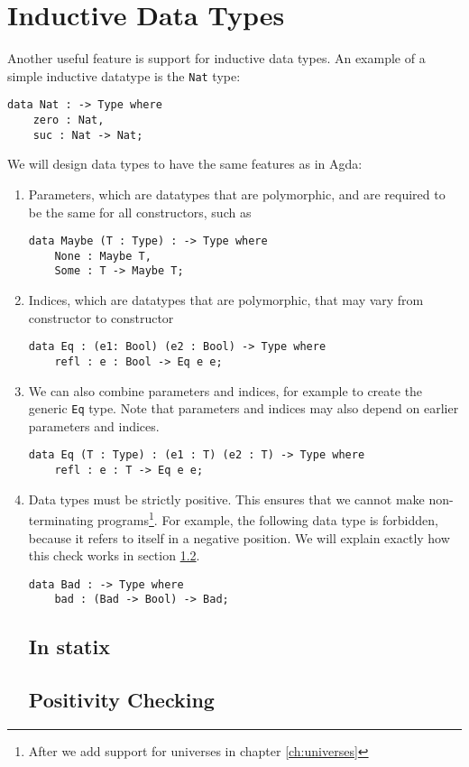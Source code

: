 \chapter{Inductive Data Types}
\label{ch:datatypes}

Another useful feature is support for inductive data types. An example of a simple inductive datatype is the \verb|Nat| type:
\begin{lstlisting}
data Nat : -> Type where
    zero : Nat,
    suc : Nat -> Nat;
\end{lstlisting}
We will design data types to have the same features as in Agda:
\begin{enumerate}
\item Parameters, which are datatypes that are polymorphic, and are required to be the same for all constructors, such as
\begin{lstlisting}
data Maybe (T : Type) : -> Type where
    None : Maybe T,
    Some : T -> Maybe T;
\end{lstlisting}
\item Indices, which are datatypes that are polymorphic, that may vary from constructor to constructor
\begin{lstlisting}
data Eq : (e1: Bool) (e2 : Bool) -> Type where
    refl : e : Bool -> Eq e e;
\end{lstlisting}
\item We can also combine parameters and indices, for example to create the generic \verb|Eq| type. Note that parameters and indices may also depend on earlier parameters and indices.
\begin{lstlisting}
data Eq (T : Type) : (e1 : T) (e2 : T) -> Type where
    refl : e : T -> Eq e e;
\end{lstlisting}
\item Data types must be strictly positive. This ensures that we cannot make non-terminating programs\footnote{After we add support for universes in chapter \ref{ch:universes}}. For example, the following data type is forbidden, because it refers to itself in a negative position. We will explain exactly how this check works in section \ref{ch:datatypes:positivity}.
\begin{lstlisting}
data Bad : -> Type where
	bad : (Bad -> Bool) -> Bad;
\end{lstlisting}

\section{In statix}



\section{Positivity Checking}
\label{ch:datatypes:positivity}
	
\end{enumerate}